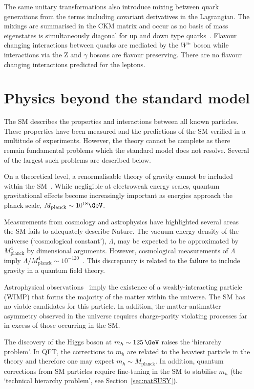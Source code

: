 The same unitary transformations also introduce mixing between quark generations from the 
terms including covariant derivatives in the Lagrangian. The mixings are summarised in the 
CKM matrix and occur as no basis of mass eigenstates is simultaneously diagonal for 
up and down type quarks~\cite{CKM}. Flavour changing
interactions between quarks are mediated by the $W^{\pm}$ boson while interactions via 
the Z and $\gamma$ bosons are flavour preserving. There are no flavour changing interactions
predicted for the leptons.

\section{Physics beyond the standard model}

The SM describes the properties and interactions between all known particles. These properties 
have been measured and the predictions of the SM verified in a multitude
of experiments. However, the theory cannot be complete 
as there remain fundamental problems which the standard model does not resolve.
Several of the largest such problems are described below.

On a theoretical level, a renormalisable theory of gravity cannot be included within 
the SM~\cite{gravRenorm}. While negligible at electroweak energy
scales, quantum gravitational effects become increasingly important as
energies approach the planck scale, $M_{\text{planck}} \sim 10^{18} \GeV$. 

Measurements from cosmology and astrophysics have highlighted several areas
the SM fails to adequately describe Nature. The vacuum energy density 
of the universe (`cosmological constant'), $\Lambda$, 
may be expected to be approximated by $M^4_{\text{planck}}$ by dimensional 
arguments. However, cosmological measurements of $\Lambda$ imply 
$\Lambda/M_{\text{planck}}^4 \sim 10^{-120}$~\cite{cosConst}. This discrepancy
is related to the failure to include gravity in a quantum field theory.

Astrophysical observations~\cite{WIMP} imply the existence 
of a weakly-interacting particle (WIMP) that forms the majority of the matter 
within the universe. The SM has no viable candidates for 
this particle. In addition, the matter-antimatter asymmetry observed in the universe requires 
charge-parity violating processes far in excess of those occurring in the SM.

The discovery of the Higgs boson at $m_{h}\sim125\,\GeV$ raises the `hierarchy problem'. In QFT, 
the corrections to $m_h$ are related to the heaviest particle in the theory and therefore
one may expect $m_h \sim M_{\text{planck}}$. In addition, quantum corrections from SM particles
require fine-tuning in the SM to stabilise $m_h$ (the `technical hierarchy problem', see Section~\ref{sec:natSUSY}).


